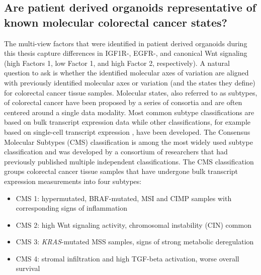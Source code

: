 \begin{flushleft}
\subsection{Are patient derived organoids representative of known molecular colorectal cancer states?}

The multi-view factors that were identified in patient derived organoids during this thesis capture differences in IGF1R-, EGFR-, and canonical Wnt signaling (high Factors 1, low Factor 1, and high Factor 2, respectively). A natural question to ask is whether the identified molecular axes of variation are aligned with previously identified molecular axes or variation (and the states they define) for colorectal cancer tissue samples. Molecular states, also referred to as subtypes, of colorectal cancer have been proposed by a series of consortia and are often centered around a single data modality. Most common subtype classifications are based on bulk transcript expression data \parencite{guinneyConsensusMolecularSubtypes2015} while other classifications, for example based on single-cell transcript expression \parencite{joanitoSinglecellBulkTranscriptome2022}, have been developed. The Consensus Molecular Subtypes (CMS) classification \parencite{guinneyConsensusMolecularSubtypes2015} is among the most widely used subtype classification and was developed by a consortium of researchers that had previously published multiple independent classifications. The CMS classification groups colorectal cancer tissue samples that have undergone bulk transcript expression measurements into four subtypes:

\begin{itemize} 
    \item CMS 1: hypermutated, BRAF-mutated, MSI and CIMP samples with corresponding signs of inflammation
    \item CMS 2: high Wnt signaling activity, chromosomal instability (CIN) common
    \item CMS 3: \textit{KRAS}-mutated MSS samples, signs of strong metabolic deregulation
    \item CMS 4: stromal infiltration and high TGF-beta activation, worse overall survival
\end{itemize}


\end{flushleft}
